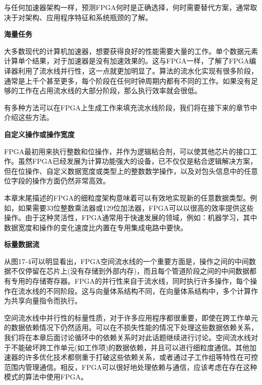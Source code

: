 与任何加速器架构一样，预测FPGA何时是正确选择，何时需要替代方案，通常取决于对架构、应用程序特征和系统瓶颈的了解。\par

\hspace*{\fill} \par %
\textbf{海量任务}

大多数现代的计算机加速器，想要获得良好的性能需要大量的工作。单个数据元素计算单个结果，对于加速器是没有加速效果的。这与FPGA一样，了解了FPGA编译器利用了流水线并行性，这一点就更加明显了。算法的流水化实现有很多阶段，通常是上千个甚至更多，每个阶段在任何时钟周期内都有不同的工作。如果没有足够的工作在占用流水线的大部分阶段，那么执行效率就会很低。\par

有多种方法可以在FPGA上生成工作来填充流水线阶段，我们将在接下来的章节中介绍这些方法。\par

\hspace*{\fill} \par %
\textbf{自定义操作或操作宽度}

FPGA最初用来执行整数和位操作，并作为逻辑粘合剂，可以使其他芯片的接口工作。虽然FPGA已经发展为计算功能强大的设备，已不仅仅是粘合逻辑解决方案，但在位操作、自定义数据宽度或类型上的整数数学操作，以及对包头信息中的任意位字段的操作方面仍然非常高效。\par

本章末尾描述的FPGA的细粒度架构意味着可以有效地实现新的任意数据类型。例如，如果需要33位整数乘法器或129位加法器，FPGA可以以很高的效率提供这些操作。由于这种灵活性，FPGA通常用于快速发展的领域，例如：机器学习，其中数据宽度和操作的变化速度比内置在专用集成电路中要快。\par

\hspace*{\fill} \par %
\textbf{标量数据流}

从图17-4可以明显看出，FPGA空间流水线的一个重要方面是，操作之间的中间数据不仅停留在芯片上(没有存储到外部内存)，而且每个管道阶段之间的中间数据都有专用的存储寄存器。FPGA的并行性来自于流水线，同时执行许多操作，每个操作在流水线的不同阶段。这与向量体系结构不同，在向量体系结构中，多个计算作为共享向量指令而执行。\par

空间流水线中并行性的标量性质，对于许多应用程序都很重要，即使在跨工作单元的数据依赖情况下仍然适用。可以在不损失性能的情况下处理这些数据依赖关系，我们将在本章后面讨论循环中的依赖关系时对此话题继续进行讨论。空间流水线对于不能破坏跨工作单元(如工作项)的数据依赖，并且可以进行细粒度通信。其他加速器的许多优化技术都侧重于打破这些依赖关系，或者通过子工作组等特性在可控范围内管理通信。相反，FPGA可以很好地处理依赖与通信，应该考虑在存在这种模式的算法中使用FPGA。\par

